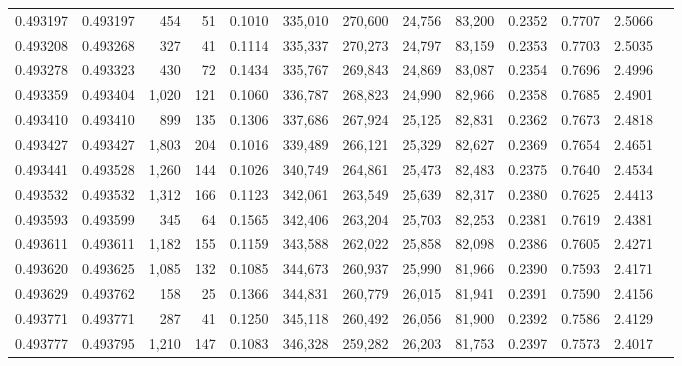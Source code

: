 \begin{tabular}{rrrrrrrrrrrrr}
0.493197 & 0.493197 &   454 &    51 &                                     0.1010 & 335,010 & 270,600 &  24,756 &  83,200 & 0.2352 & 0.7707 & 2.5066 \\
0.493208 & 0.493268 &   327 &    41 &                                     0.1114 & 335,337 & 270,273 &  24,797 &  83,159 & 0.2353 & 0.7703 & 2.5035 \\
0.493278 & 0.493323 &   430 &    72 &                                     0.1434 & 335,767 & 269,843 &  24,869 &  83,087 & 0.2354 & 0.7696 & 2.4996 \\
0.493359 & 0.493404 & 1,020 &   121 &                                     0.1060 & 336,787 & 268,823 &  24,990 &  82,966 & 0.2358 & 0.7685 & 2.4901 \\
0.493410 & 0.493410 &   899 &   135 &                                     0.1306 & 337,686 & 267,924 &  25,125 &  82,831 & 0.2362 & 0.7673 & 2.4818 \\
0.493427 & 0.493427 & 1,803 &   204 &                                     0.1016 & 339,489 & 266,121 &  25,329 &  82,627 & 0.2369 & 0.7654 & 2.4651 \\
0.493441 & 0.493528 & 1,260 &   144 &                                     0.1026 & 340,749 & 264,861 &  25,473 &  82,483 & 0.2375 & 0.7640 & 2.4534 \\
0.493532 & 0.493532 & 1,312 &   166 &                                     0.1123 & 342,061 & 263,549 &  25,639 &  82,317 & 0.2380 & 0.7625 & 2.4413 \\
0.493593 & 0.493599 &   345 &    64 &                                     0.1565 & 342,406 & 263,204 &  25,703 &  82,253 & 0.2381 & 0.7619 & 2.4381 \\
0.493611 & 0.493611 & 1,182 &   155 &                                     0.1159 & 343,588 & 262,022 &  25,858 &  82,098 & 0.2386 & 0.7605 & 2.4271 \\
0.493620 & 0.493625 & 1,085 &   132 &                                     0.1085 & 344,673 & 260,937 &  25,990 &  81,966 & 0.2390 & 0.7593 & 2.4171 \\
0.493629 & 0.493762 &   158 &    25 &                                     0.1366 & 344,831 & 260,779 &  26,015 &  81,941 & 0.2391 & 0.7590 & 2.4156 \\
0.493771 & 0.493771 &   287 &    41 &                                     0.1250 & 345,118 & 260,492 &  26,056 &  81,900 & 0.2392 & 0.7586 & 2.4129 \\
0.493777 & 0.493795 & 1,210 &   147 &                                     0.1083 & 346,328 & 259,282 &  26,203 &  81,753 & 0.2397 & 0.7573 & 2.4017 \\

\end{tabular}
